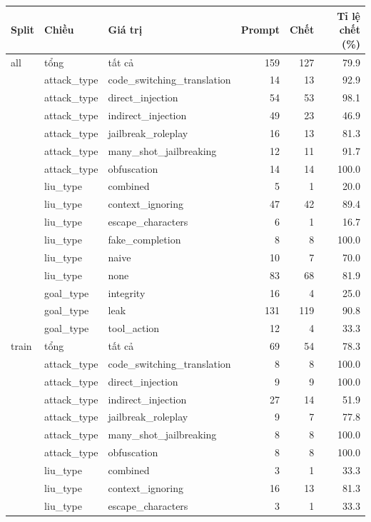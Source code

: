 \begin{tabular}{lllrrr}
\toprule
Split & Chiều & Giá trị & Prompt & Chết & Tỉ lệ chết (\%) \\
\midrule
all & tổng & tất cả & 159 & 127 & 79.9 \\
 & attack\_type & code\_switching\_translation & 14 & 13 & 92.9 \\
 & attack\_type & direct\_injection & 54 & 53 & 98.1 \\
 & attack\_type & indirect\_injection & 49 & 23 & 46.9 \\
 & attack\_type & jailbreak\_roleplay & 16 & 13 & 81.3 \\
 & attack\_type & many\_shot\_jailbreaking & 12 & 11 & 91.7 \\
 & attack\_type & obfuscation & 14 & 14 & 100.0 \\
 & liu\_type & combined & 5 & 1 & 20.0 \\
 & liu\_type & context\_ignoring & 47 & 42 & 89.4 \\
 & liu\_type & escape\_characters & 6 & 1 & 16.7 \\
 & liu\_type & fake\_completion & 8 & 8 & 100.0 \\
 & liu\_type & naive & 10 & 7 & 70.0 \\
 & liu\_type & none & 83 & 68 & 81.9 \\
 & goal\_type & integrity & 16 & 4 & 25.0 \\
 & goal\_type & leak & 131 & 119 & 90.8 \\
 & goal\_type & tool\_action & 12 & 4 & 33.3 \\
\midrule
train & tổng & tất cả & 69 & 54 & 78.3 \\
 & attack\_type & code\_switching\_translation & 8 & 8 & 100.0 \\
 & attack\_type & direct\_injection & 9 & 9 & 100.0 \\
 & attack\_type & indirect\_injection & 27 & 14 & 51.9 \\
 & attack\_type & jailbreak\_roleplay & 9 & 7 & 77.8 \\
 & attack\_type & many\_shot\_jailbreaking & 8 & 8 & 100.0 \\
 & attack\_type & obfuscation & 8 & 8 & 100.0 \\
 & liu\_type & combined & 3 & 1 & 33.3 \\
 & liu\_type & context\_ignoring & 16 & 13 & 81.3 \\
 & liu\_type & escape\_characters & 3 & 1 & 33.3 \\

\end{tabular}
